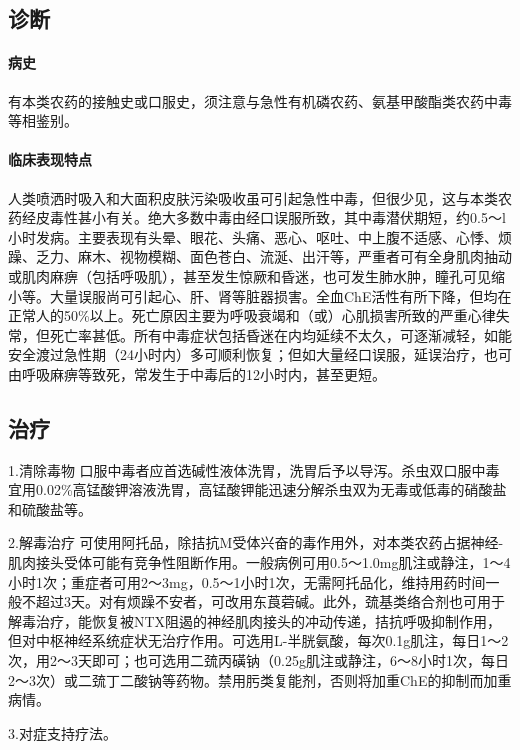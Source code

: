 \subsection{诊断}

\paragraph{病史}

有本类农药的接触史或口服史，须注意与急性有机磷农药、氨基甲酸酯类农药中毒等相鉴别。

\paragraph{临床表现特点}

人类喷洒时吸入和大面积皮肤污染吸收虽可引起急性中毒，但很少见，这与本类农药经皮毒性甚小有关。绝大多数中毒由经口误服所致，其中毒潜伏期短，约0.5～l小时发病。主要表现有头晕、眼花、头痛、恶心、呕吐、中上腹不适感、心悸、烦躁、乏力、麻木、视物模糊、面色苍白、流涎、出汗等，严重者可有全身肌肉抽动或肌肉麻痹（包括呼吸肌），甚至发生惊厥和昏迷，也可发生肺水肿，瞳孔可见缩小等。大量误服尚可引起心、肝、肾等脏器损害。全血ChE活性有所下降，但均在正常人的50\%以上。死亡原因主要为呼吸衰竭和（或）心肌损害所致的严重心律失常，但死亡率甚低。所有中毒症状包括昏迷在内均延续不太久，可逐渐减轻，如能安全渡过急性期（24小时内）多可顺利恢复；但如大量经口误服，延误治疗，也可由呼吸麻痹等致死，常发生于中毒后的12小时内，甚至更短。

\subsection{治疗}

1.清除毒物
口服中毒者应首选碱性液体洗胃，洗胃后予以导泻。杀虫双口服中毒宜用0.02\%高锰酸钾溶液洗胃，高锰酸钾能迅速分解杀虫双为无毒或低毒的硝酸盐和硫酸盐等。

2.解毒治疗
可使用阿托品，除拮抗M受体兴奋的毒作用外，对本类农药占据神经-肌肉接头受体可能有竞争性阻断作用。一般病例可用0.5～1.0mg肌注或静注，1～4小时1次；重症者可用2～3mg，0.5～1小时1次，无需阿托品化，维持用药时间一般不超过3天。对有烦躁不安者，可改用东莨菪碱。此外，巯基类络合剂也可用于解毒治疗，能恢复被NTX阻遏的神经肌肉接头的冲动传递，拮抗呼吸抑制作用，但对中枢神经系统症状无治疗作用。可选用L-半胱氨酸，每次0.1g肌注，每日1～2次，用2～3天即可；也可选用二巯丙磺钠（0.25g肌注或静注，6～8小时1次，每日2～3次）或二巯丁二酸钠等药物。禁用肟类复能剂，否则将加重ChE的抑制而加重病情。

3.对症支持疗法。

